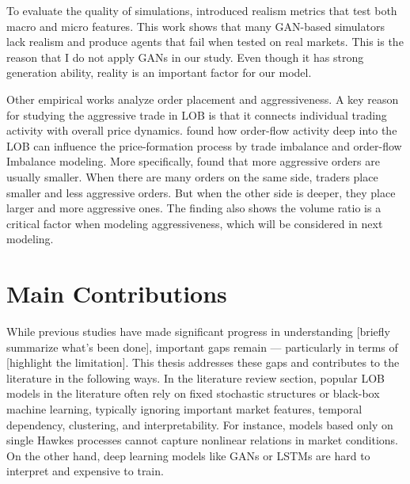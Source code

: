 
To evaluate the quality of simulations, \cite{vyetrenko_get_2019} introduced realism metrics that test both macro and micro features. This work shows that many GAN-based simulators lack realism and produce agents that fail when tested on real markets. This is the reason that I do not apply GANs in our study. Even though it has strong generation ability, reality is an important factor for our model.



Other empirical works analyze order placement and aggressiveness. A key reason for studying the aggressive trade in LOB is that it connects individual trading activity with overall price dynamics. \cite{xu2019multilevelorderflowimbalancelimit} found how order-flow activity deep into the LOB can influence the price-formation process by trade imbalance and order-flow Imbalance modeling. More specifically, \cite{OrderAggressiveness2010} found that more aggressive orders are usually smaller. When there are many orders on the same side, traders place smaller and less aggressive orders. But when the other side is deeper, they place larger and more aggressive ones. The finding also shows the volume ratio is a critical factor when modeling aggressiveness, which will be considered in next modeling. 





\section{Main Contributions} \label{sec:maincontributions}
While previous studies have made significant progress in understanding [briefly summarize what's been done], important gaps remain — particularly in terms of [highlight the limitation]. This thesis addresses these gaps and contributes to the literature in the following ways. In the literature review section, popular LOB models in the literature often rely on fixed stochastic structures or black-box machine learning, typically ignoring important market features, temporal dependency, clustering, and interpretability. For instance, models based only on single Hawkes processes cannot capture nonlinear relations in market conditions. On the other hand, deep learning models like GANs or LSTMs are hard to interpret and expensive to train.

